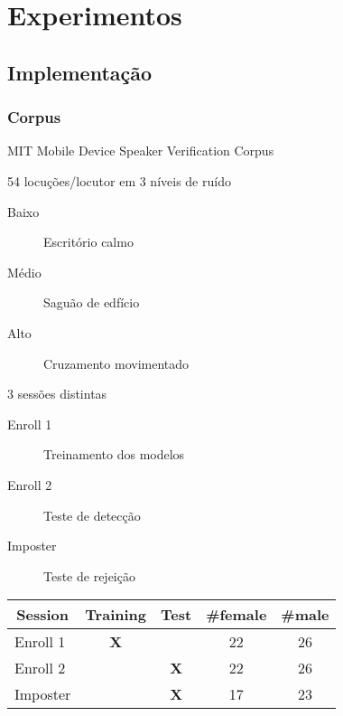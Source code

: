\section{Experimentos}
\label{sec:experiments}

\contentscurrent

\subsection{Implementação}

\begin{frame}
\frametitle{Corpus}
\begin{description}
    \item[Base] MIT Mobile Device Speaker Verification Corpus
    \pause
    \item 54 locuções/locutor em 3 níveis de ruído
    \pause
    \begin{description}
        \item[Baixo] Escritório calmo
        \item[Médio] Saguão de edfício
        \item[Alto] Cruzamento movimentado
        \pause
    \end{description}
    \item 3 sessões distintas
    \begin{description}
        \item[Enroll 1] Treinamento dos modelos
        \item[Enroll 2] Teste de detecção
        \item[Imposter] Teste de rejeição
        \pause
    \end{description}
\end{description}

\begin{table}[h]
    \centering
    \begin{tabular}{|l|c|c|c|c|}
    \hline
    \multicolumn{1}{|c|}{{\bf Session}} & {\bf Training} & {\bf Test} & {\bf \#female} & {\bf \#male} \\ \hline
    Enroll 1 & {\bf X} & {\bf } & 22 & 26 \\ \hline
    Enroll 2 & {\bf } & {\bf X} & 22 & 26 \\ \hline
    Imposter & {\bf } & {\bf X} & 17 & 23 \\ \hline
    \end{tabular}
\end{table}
\end{frame}

